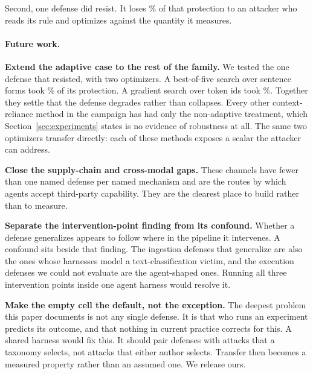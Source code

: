 Second, one defense did resist. It loses \PctAcdRemovedGradient{}\% of that
protection to an
attacker who reads its rule and optimizes against the quantity it measures.

\paragraph{Future work.}

\textbf{Extend the adaptive case to the rest of the family.} We tested the
one defense that resisted,
with two optimizers. A best-of-five search over sentence forms took
\PctAcdRemovedBestOf{}\% of
its protection. A gradient search over token ids took
\PctAcdRemovedGradient{}\%. Together they
settle that the defense degrades rather than collapses.
Every other context-reliance method in the campaign has had only the
non-adaptive treatment, which Section~\ref{sec:experiments} states is no
evidence of robustness at all. The same two optimizers transfer directly: each
of these methods exposes a scalar the attacker can address.

\textbf{Close the supply-chain and cross-modal gaps.} These channels have fewer
than one named defense per named mechanism and are the routes by which agents
accept third-party capability. They are the clearest place to build rather than
to measure.

\textbf{Separate the intervention-point finding from its confound.} Whether a
defense generalizes appears to follow where in the pipeline it intervenes. A
confound sits beside that finding. The ingestion defenses that generalize are
also the ones whose harnesses model a text-classification victim, and the
execution defenses we could not evaluate are the agent-shaped ones. Running all three intervention points
inside one agent harness would resolve it.

\textbf{Make the empty cell the default, not the exception.} The deepest
problem this paper documents is not any single defense. It is that who runs an experiment predicts its
outcome, and that nothing in current practice corrects for this. A shared harness would fix this. It should pair defenses with attacks that a
taxonomy selects, not attacks that either author selects. Transfer then
becomes a measured property rather than an assumed one. We release ours.
